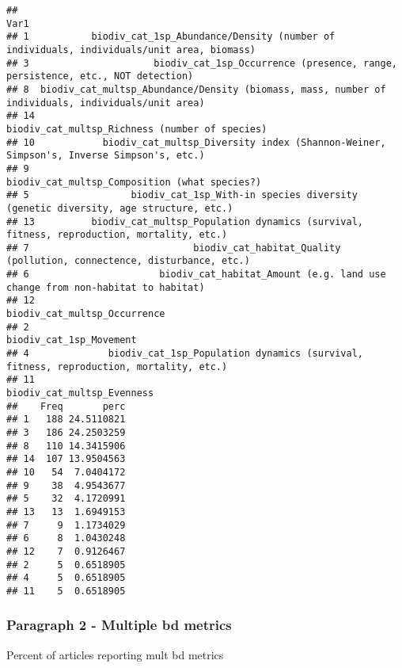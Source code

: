 \documentclass[
]{article}
\newenvironment{Shaded}{\begin{snugshade}}{\end{snugshade}}
\newcommand{\DecValTok}[1]{\textcolor[rgb]{0.00,0.00,0.81}{#1}}
\newcommand{\KeywordTok}[1]{\textcolor[rgb]{0.13,0.29,0.53}{\textbf{#1}}}
\newcommand{\NormalTok}[1]{#1}
\newcommand{\OperatorTok}[1]{\textcolor[rgb]{0.81,0.36,0.00}{\textbf{#1}}}
\newcommand{\StringTok}[1]{\textcolor[rgb]{0.31,0.60,0.02}{#1}}
\begin{document}
\begin{verbatim}
##                                                                                                 Var1
## 1           biodiv_cat_1sp_Abundance/Density (number of individuals, individuals/unit area, biomass)
## 3                      biodiv_cat_1sp_Occurrence (presence, range, persistence, etc., NOT detection)
## 8  biodiv_cat_multsp_Abundance/Density (biomass, mass, number of individuals, individuals/unit area)
## 14                                                    biodiv_cat_multsp_Richness (number of species)
## 10            biodiv_cat_multsp_Diversity index (Shannon-Weiner, Simpson's, Inverse Simpson's, etc.)
## 9                                                      biodiv_cat_multsp_Composition (what species?)
## 5                  biodiv_cat_1sp_With-in species diversity (genetic diversity, age structure, etc.)
## 13          biodiv_cat_multsp_Population dynamics (survival, fitness, reproduction, mortality, etc.)
## 7                             biodiv_cat_habitat_Quality (pollution, connectence, disturbance, etc.)
## 6                       biodiv_cat_habitat_Amount (e.g. land use change from non-habitat to habitat)
## 12                                                                      biodiv_cat_multsp_Occurrence
## 2                                                                            biodiv_cat_1sp_Movement
## 4              biodiv_cat_1sp_Population dynamics (survival, fitness, reproduction, mortality, etc.)
## 11                                                                        biodiv_cat_multsp_Evenness
##    Freq       perc
## 1   188 24.5110821
## 3   186 24.2503259
## 8   110 14.3415906
## 14  107 13.9504563
## 10   54  7.0404172
## 9    38  4.9543677
## 5    32  4.1720991
## 13   13  1.6949153
## 7     9  1.1734029
## 6     8  1.0430248
## 12    7  0.9126467
## 2     5  0.6518905
## 4     5  0.6518905
## 11    5  0.6518905
\end{verbatim}

\hypertarget{paragraph-2---multiple-bd-metrics}{%
\subsubsection{Paragraph 2 - Multiple bd
metrics}\label{paragraph-2---multiple-bd-metrics}}

Percent of articles reporting mult bd metrics

\begin{Shaded}
\end{Shaded}
\end{document}
